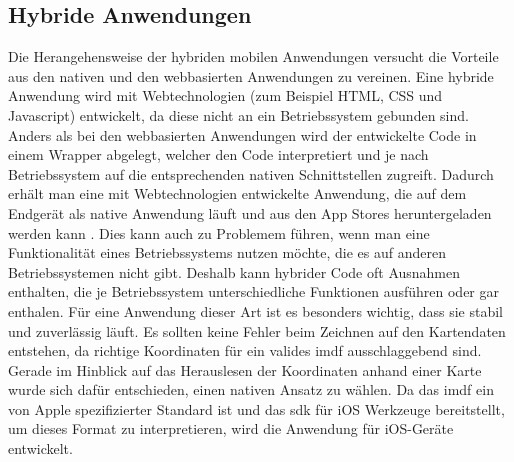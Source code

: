 \subsection{Hybride Anwendungen}
Die Herangehensweise der hybriden mobilen Anwendungen versucht die Vorteile aus den nativen und den webbasierten Anwendungen zu vereinen.
Eine hybride Anwendung wird mit Webtechnologien (zum Beispiel HTML, CSS und Javascript) entwickelt, da diese nicht an ein Betriebssystem gebunden sind.
Anders als bei den webbasierten Anwendungen wird der entwickelte Code in einem Wrapper abgelegt, welcher den Code interpretiert und je nach Betriebssystem auf die entsprechenden nativen Schnittstellen zugreift.
Dadurch erhält man eine mit Webtechnologien entwickelte Anwendung, die auf dem Endgerät als native Anwendung läuft und aus den App Stores heruntergeladen werden kann \parencite{HUY2017}.
Dies kann auch zu Problemem führen, wenn man eine Funktionalität eines Betriebssystems nutzen möchte, die es auf anderen Betriebssystemen nicht gibt.
Deshalb kann hybrider Code oft Ausnahmen enthalten, die je Betriebssystem unterschiedliche Funktionen ausführen oder gar enthalen.\pbreak%
%
Für eine Anwendung dieser Art ist es besonders wichtig, dass sie stabil und zuverlässig läuft.
Es sollten keine Fehler beim Zeichnen auf den Kartendaten entstehen, da richtige Koordinaten für ein valides \acl{imdf} ausschlaggebend sind.
Gerade im Hinblick auf das Herauslesen der Koordinaten anhand einer Karte wurde sich dafür entschieden, einen nativen Ansatz zu wählen.
Da das \acl{imdf} ein von Apple spezifizierter Standard ist und das \Gls{sdk} für iOS Werkzeuge bereitstellt, um dieses Format zu interpretieren, wird die Anwendung für iOS-Geräte entwickelt.
